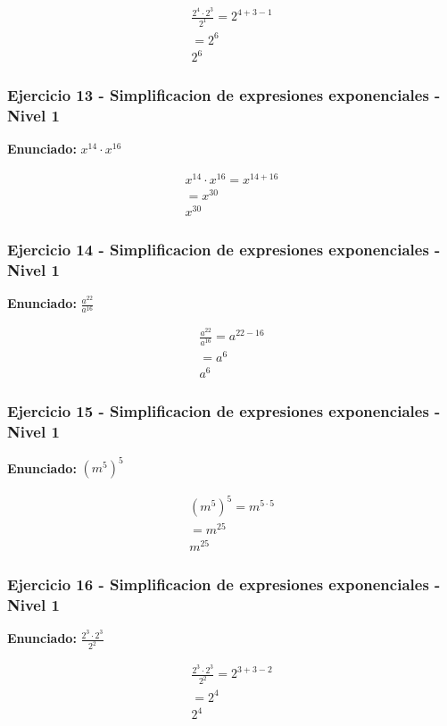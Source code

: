 \documentclass[12pt,a4paper]{article}
\begin{document}
\[
\begin{aligned}
\frac{2^{4}\cdot 2^{3}}{2^{1}}=2^{4+3-1}\\
=2^{6}\\
\boxed{2^{6}}
\end{aligned}
\]


\subsubsection*{Ejercicio 13 - Simplificacion de expresiones exponenciales - Nivel 1}
\textbf{Enunciado:} \(x^{14}\cdot x^{16}\)

\[
\begin{aligned}
x^{14}\cdot x^{16}=x^{14+16}\\
=x^{30}\\
\boxed{x^{30}}
\end{aligned}
\]


\subsubsection*{Ejercicio 14 - Simplificacion de expresiones exponenciales - Nivel 1}
\textbf{Enunciado:} \(\frac{a^{22}}{a^{16}}\)

\[
\begin{aligned}
\frac{a^{22}}{a^{16}}=a^{22-16}\\
=a^{6}\\
\boxed{a^{6}}
\end{aligned}
\]


\subsubsection*{Ejercicio 15 - Simplificacion de expresiones exponenciales - Nivel 1}
\textbf{Enunciado:} \(\left(m^{5}\right)^{5}\)

\[
\begin{aligned}
\left(m^{5}\right)^{5}=m^{5\cdot 5}\\
=m^{25}\\
\boxed{m^{25}}
\end{aligned}
\]


\subsubsection*{Ejercicio 16 - Simplificacion de expresiones exponenciales - Nivel 1}
\textbf{Enunciado:} \(\frac{2^{3}\cdot 2^{3}}{2^{2}}\)

\[
\begin{aligned}
\frac{2^{3}\cdot 2^{3}}{2^{2}}=2^{3+3-2}\\
=2^{4}\\
\boxed{2^{4}}
\end{aligned}
\]
\end{document}
